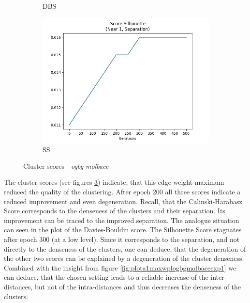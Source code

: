 \begin{figure}[H]
\begin{subfigure}{0.3\textwidth}
				\caption{DBS}
				\label{fig:plota1scoredaviesbouldinogbgmolbaceexp1}
			\end{subfigure}
			\begin{subfigure}{0.3\textwidth}
				\centering
				\includegraphics[width=1.1\linewidth]{images/plotA1_Score_Silhouette_ogbgMolbaceExp1}
				\caption{SS}
				\label{fig:plota1scoresilhouetteogbgmolbaceexp1}
			\end{subfigure}
			\caption{Cluster scores - \textit{ogbg-molbace}}
			\label{fig:ClScores_molbace}
		\end{figure}
				
		The cluster scores (see figures \ref{fig:ClScores_molbace}) indicate, that this edge weight maximum reduced the quality of the clustering.
		After epoch 200 all three scores indicate a reduced improvement and even degeneration.
		Recall, that the Calinski-Harabasz Score corresponds to the denseness of the clusters and their separation.
		Its improvement can be traced to the improved separation.
		The analogue situation can seen in the plot of the Davies-Bouldin score.
		The Silhouette Score stagnates after epoch 300 (at a low level).
		Since it corresponds to the separation, and not directly to the denseness of the clusters, one can deduce, that the degeneration of the other two scores can be explained by a degeneration of the cluster denseness.
		Combined with the insight from figure \ref{fig:plota1maxwplogbgmolbaceexp1} we can deduce, that the chosen setting leads to a reliable increase of the inter-distances, but not of the intra-distances and thus decreases the denseness of the clusters.
		
